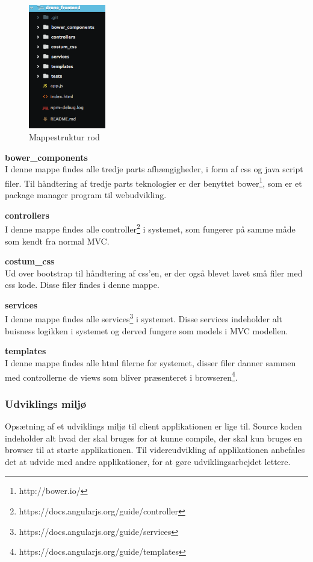\begin{figure}[H]
	\centering
	\includegraphics[width=0.3\textwidth]{Billeder/implementation/mappestruktur_client.png}
	\caption{Mappestruktur rod}
	\label{fig:mappestruktur_client}
\end{figure}

\textbf{bower\_components}\\
I denne mappe findes alle tredje parts afhængigheder, i form af css og java script filer. Til håndtering af tredje parts teknologier er der benyttet bower\footnote{http://bower.io/}, som er et package manager program til webudvikling.

\textbf{controllers}\\
I denne mappe findes alle controller\footnote{https://docs.angularjs.org/guide/controller} i systemet, som fungerer på samme måde som kendt fra normal MVC.

\textbf{costum\_css}\\
Ud over bootstrap til håndtering af css'en, er der også blevet lavet små filer med css kode. Disse filer findes i denne mappe.

\textbf{services}\\
I denne mappe findes alle services\footnote{https://docs.angularjs.org/guide/services} i systemet. Disse services indeholder alt buisness logikken i systemet og derved fungere som models i MVC modellen.

\textbf{templates}\\
I denne mappe findes alle html filerne for systemet, disser filer danner sammen med controllerne de views som bliver præsenteret i browseren\footnote{https://docs.angularjs.org/guide/templates}.

\subsubsection*{Udviklings miljø}
Opsætning af et udviklings miljø til client applikationen er lige til. Source koden indeholder alt hvad der skal bruges for at kunne compile, der skal kun bruges en browser til at starte applikationen. Til videreudvikling af applikationen anbefales det at udvide med andre applikationer, for at gøre udviklingsarbejdet lettere.

